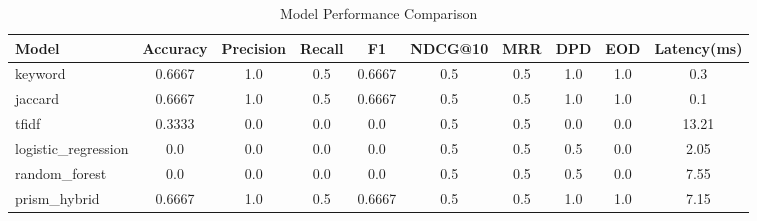 \begin{table}[htbp]
\centering
\caption{Model Performance Comparison}
\label{tab:model_comparison}
\begin{tabular}{lccccccccc}
\hline
Model & Accuracy & Precision & Recall & F1 & NDCG@10 & MRR & DPD & EOD & Latency(ms) \\
\hline
keyword & 0.6667 & 1.0 & 0.5 & 0.6667 & 0.5 & 0.5 & 1.0 & 1.0 & 0.3 \\
jaccard & 0.6667 & 1.0 & 0.5 & 0.6667 & 0.5 & 0.5 & 1.0 & 1.0 & 0.1 \\
tfidf & 0.3333 & 0.0 & 0.0 & 0.0 & 0.5 & 0.5 & 0.0 & 0.0 & 13.21 \\
logistic_regression & 0.0 & 0.0 & 0.0 & 0.0 & 0.5 & 0.5 & 0.5 & 0.0 & 2.05 \\
random_forest & 0.0 & 0.0 & 0.0 & 0.0 & 0.5 & 0.5 & 0.5 & 0.0 & 7.55 \\
prism_hybrid & 0.6667 & 1.0 & 0.5 & 0.6667 & 0.5 & 0.5 & 1.0 & 1.0 & 7.15 \\
\hline
\end{tabular}
\end{table}